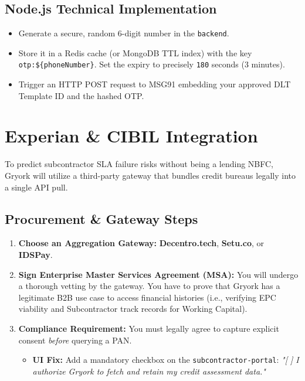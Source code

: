 \documentclass[11pt, a4paper]{report}
\begin{document}
\section{Node.js Technical Implementation}
\begin{itemize}
    \item Generate a secure, random 6-digit number in the \texttt{backend}.
    \item Store it in a Redis cache (or MongoDB TTL index) with the key \texttt{otp:\$\{phoneNumber\}}. Set the expiry to precisely \texttt{180} seconds (3 minutes).
    \item Trigger an HTTP POST request to MSG91 embedding your approved DLT Template ID and the hashed OTP.
\end{itemize}

\chapter{Experian \& CIBIL Integration}

To predict subcontractor SLA failure risks without being a lending NBFC, Gryork will utilize a third-party gateway that bundles credit bureaus legally into a single API pull.

\section{Procurement \& Gateway Steps}
\begin{enumerate}[label=\textbf{\textcolor{gryorkBlue}{\arabic*.}}, itemsep=0.3em]
    \item \textbf{Choose an Aggregation Gateway:} \textbf{Decentro.tech}, \textbf{Setu.co}, or \textbf{IDSPay}.
    \item \textbf{Sign Enterprise Master Services Agreement (MSA):} You will undergo a thorough vetting by the gateway. You have to prove that Gryork has a legitimate B2B use case to access financial histories (i.e., verifying EPC viability and Subcontractor track records for Working Capital).
    \item \textbf{Compliance Requirement:} You must legally agree to capture explicit consent \textit{before} querying a PAN. 
        \begin{itemize}
            \item \textbf{UI Fix:} Add a mandatory checkbox on the \texttt{subcontractor-portal}: \textit{"[ ] I authorize Gryork to fetch and retain my credit assessment data."}
        \end{itemize}
\end{enumerate}
\end{document}
